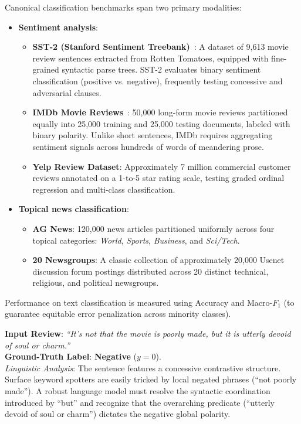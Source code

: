 \documentclass[../../../main.tex]{subfiles}
\begin{document}
Canonical classification benchmarks span two primary modalities:
\begin{itemize}
    \item \textbf{Sentiment analysis}:
    \begin{itemize}
        \item \textbf{SST-2 (Stanford Sentiment Treebank)}~\cite{socher2013sst}: A dataset of 9,613 movie review sentences extracted from Rotten Tomatoes, equipped with fine-grained syntactic parse trees. SST-2 evaluates binary sentiment classification (positive vs. negative), frequently testing concessive and adversarial clauses.
        \item \textbf{IMDb Movie Reviews}~\cite{maas2011imdb}: 50,000 long-form movie reviews partitioned equally into 25,000 training and 25,000 testing documents, labeled with binary polarity. Unlike short sentences, IMDb requires aggregating sentiment signals across hundreds of words of meandering prose.
        \item \textbf{Yelp Review Dataset}: Approximately 7 million commercial customer reviews annotated on a 1-to-5 star rating scale, testing graded ordinal regression and multi-class classification.
    \end{itemize}
    \item \textbf{Topical news classification}:
    \begin{itemize}
        \item \textbf{AG News}: 120,000 news articles partitioned uniformly across four topical categories: \textit{World}, \textit{Sports}, \textit{Business}, and \textit{Sci/Tech}.
        \item \textbf{20 Newsgroups}: A classic collection of approximately 20,000 Usenet discussion forum postings distributed across 20 distinct technical, religious, and political newsgroups.
    \end{itemize}
\end{itemize}
Performance on text classification is measured using Accuracy and Macro-$F_1$ (to guarantee equitable error penalization across minority classes).

\begin{center}
\begin{minipage}{0.95\textwidth}
\begin{tcolorbox}[colback=cardBg,colframe=cardLine,arc=2pt,boxrule=0.5pt,title=\textbf{Task Example: Sentiment Classification (SST-2)}]
\small\sffamily
\textbf{Input Review}: \textit{``It's not that the movie is poorly made, but it is utterly devoid of soul or charm.''} \\
\textbf{Ground-Truth Label}: \textbf{Negative} ($y = 0$). \\
\textit{Linguistic Analysis}: The sentence features a concessive contrastive structure. Surface keyword spotters are easily tricked by local negated phrases (``not poorly made''). A robust language model must resolve the syntactic coordination introduced by ``but'' and recognize that the overarching predicate (``utterly devoid of soul or charm'') dictates the negative global polarity.
\end{tcolorbox}
\end{minipage}
\end{center}
\end{document}
